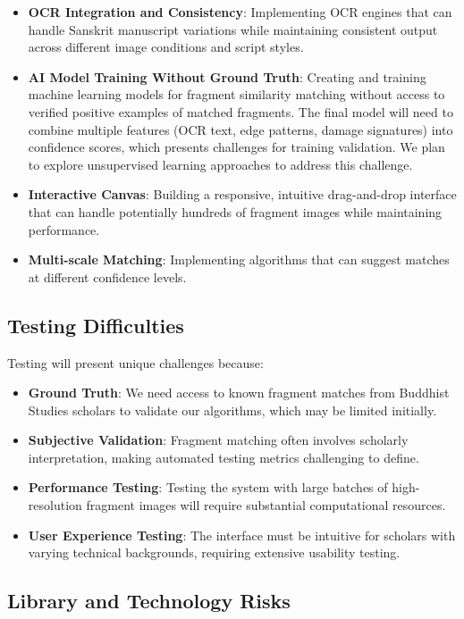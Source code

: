 \documentclass{article}
\begin{document}
\begin{itemize}
\item \textbf{OCR Integration and Consistency}: Implementing OCR engines that can handle Sanskrit manuscript variations while maintaining consistent output across different image conditions and script styles.
\item \textbf{AI Model Training Without Ground Truth}: Creating and training machine learning models for fragment similarity matching without access to verified positive examples of matched fragments. The final model will need to combine multiple features (OCR text, edge patterns, damage signatures) into confidence scores, which presents challenges for training validation. We plan to explore unsupervised learning approaches to address this challenge.
\item \textbf{Interactive Canvas}: Building a responsive, intuitive drag-and-drop interface that can handle potentially hundreds of fragment images while maintaining performance.
\item \textbf{Multi-scale Matching}: Implementing algorithms that can suggest matches at different confidence levels.
\end{itemize}

\subsection{Testing Difficulties}

Testing will present unique challenges because:

\begin{itemize}
\item \textbf{Ground Truth}: We need access to known fragment matches from Buddhist Studies scholars to validate our algorithms, which may be limited initially.
\item \textbf{Subjective Validation}: Fragment matching often involves scholarly interpretation, making automated testing metrics challenging to define.
\item \textbf{Performance Testing}: Testing the system with large batches of high-resolution fragment images will require substantial computational resources.
\item \textbf{User Experience Testing}: The interface must be intuitive for scholars with varying technical backgrounds, requiring extensive usability testing.
\end{itemize}

\subsection{Library and Technology Risks}
\end{document}
